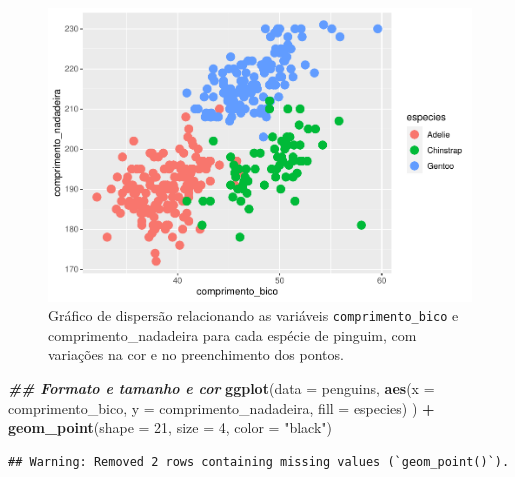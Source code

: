 \documentclass[
]{article}
\newenvironment{Shaded}{\begin{snugshade}}{\end{snugshade}}
\newcommand{\AttributeTok}[1]{\textcolor[rgb]{0.13,0.29,0.53}{#1}}
\newcommand{\DecValTok}[1]{\textcolor[rgb]{0.00,0.00,0.81}{#1}}
\newcommand{\DocumentationTok}[1]{\textcolor[rgb]{0.56,0.35,0.01}{\textbf{\textit{#1}}}}
\newcommand{\FunctionTok}[1]{\textcolor[rgb]{0.13,0.29,0.53}{\textbf{#1}}}
\newcommand{\NormalTok}[1]{#1}
\newcommand{\SpecialCharTok}[1]{\textcolor[rgb]{0.81,0.36,0.00}{\textbf{#1}}}
\newcommand{\StringTok}[1]{\textcolor[rgb]{0.31,0.60,0.02}{#1}}
\begin{document}
\begin{figure}
\centering
\includegraphics{epr_files/figure-latex/fig-scatter-shape-2.pdf}
\caption{\label{fig:fig-scatter-shape-2}Gráfico de dispersão relacionando as variáveis \texttt{comprimento\_bico} e comprimento\_nadadeira para cada espécie de pinguim, com variações na cor e no preenchimento dos pontos.}
\end{figure}

\begin{Shaded}
\begin{Highlighting}[]
\DocumentationTok{\#\# Formato e tamanho e cor}
\FunctionTok{ggplot}\NormalTok{(}\AttributeTok{data =}\NormalTok{ penguins, }
       \FunctionTok{aes}\NormalTok{(}\AttributeTok{x =}\NormalTok{ comprimento\_bico, }\AttributeTok{y =}\NormalTok{ comprimento\_nadadeira, }\AttributeTok{fill =}\NormalTok{ especies)}
\NormalTok{       ) }\SpecialCharTok{+}
    \FunctionTok{geom\_point}\NormalTok{(}\AttributeTok{shape =} \DecValTok{21}\NormalTok{, }\AttributeTok{size =} \DecValTok{4}\NormalTok{, }\AttributeTok{color =} \StringTok{"black"}\NormalTok{)}
\end{Highlighting}
\end{Shaded}

\begin{verbatim}
## Warning: Removed 2 rows containing missing values (`geom_point()`).
\end{verbatim}
\end{document}

